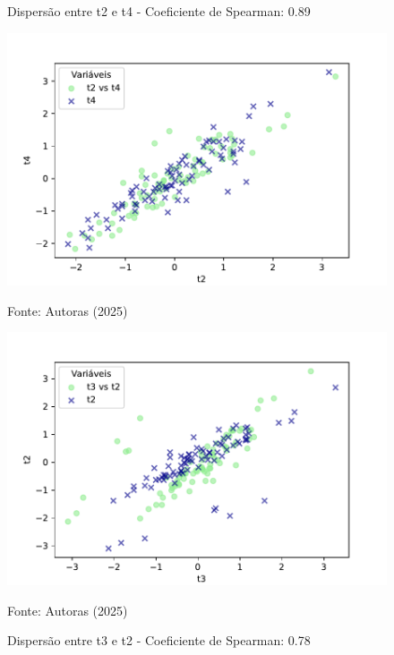 \begin{figure}[h]
    \captionsetup{font=footnotesize, justification=centering, labelsep=period, position=above}
    \centering
    \begin{minipage}[b]{0.45\linewidth}
        \caption{Dispersão entre t2 e t4 - Coeficiente de Spearman: 0.89}
        \label{fig:t2-t4}
        \centering
        \includegraphics[scale=0.35]{figuras/Spearman/t2-t4.pdf}
        \vspace{0.3cm}
        \begin{minipage}{\linewidth}
            \centering
            \scriptsize{Fonte: Autoras (2025)}
        \end{minipage}
    \end{minipage}
    \hspace{0.05\linewidth}
    \begin{minipage}[b]{0.45\linewidth}
        \caption{Dispersão entre t3 e t2 - Coeficiente de Spearman: 0.78}
        \label{fig:t3-t2}
        \centering
        \includegraphics[scale=0.35]{figuras/Spearman/t3-t2.pdf}
        \vspace{0.3cm}
        \begin{minipage}{\linewidth}
            \centering
            \scriptsize{Fonte: Autoras (2025)}
        \end{minipage}
    \end{minipage}
\end{figure}
\FloatBarrier

